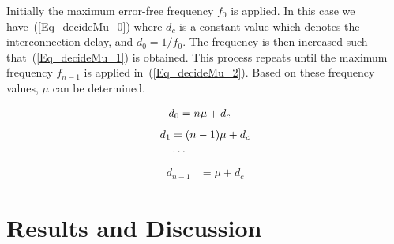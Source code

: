 \documentclass[journal]{IEEEtran}
\begin{document}
Initially the maximum error-free frequency $f_0$ is applied. In this case we have~(\ref{Eq_decideMu_0}) where $d_c$ is a constant value which denotes the interconnection delay, and $d_0=1/f_0$. The frequency is then increased such that~(\ref{Eq_decideMu_1}) is obtained. This process repeats until the maximum frequency $f_{n-1}$ is applied in~(\ref{Eq_decideMu_2}). Based on these frequency values, $\mu$ can be determined.

\begin{eqnarray}\label{Eq_decideMu_0}
  d_0 &= n\mu+d_c
  \vspace{-13ex}
\end{eqnarray}
\vspace{-4ex}
\begin{align}\label{Eq_decideMu_1}
  d_1 &= (n-1)\mu+d_c    \\
  &\cdots               \notag
  \vspace{-3ex}
\end{align}
\vspace{-4ex}
\begin{eqnarray}\label{Eq_decideMu_2}
  {d_{n-1}} &= \mu+d_c
\end{eqnarray}

\section{Results and Discussion}\label{Section_Experiments}
\end{document}

